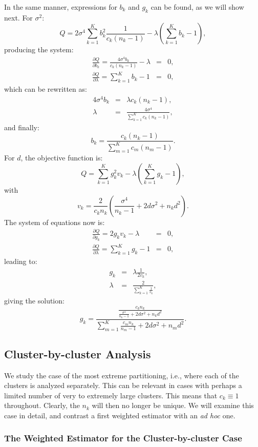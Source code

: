 \documentclass[11pt,a5paper,twoside]{book}
\begin{document}
{In the same manner, expressions for $b_k$ and $g_k$ can be found, as we will show next.
For $\sigma^2$:
$$
Q=2\sigma^4 \sum_{k=1}^K b_k^2\frac{1}{c_k(n_k-1)}-\lambda\left(\sum_{k=1}^Kb_k-1\right),
$$
producing the system:
\begin{eqnarray}
\frac{\partial Q}{\partial b_k}=\frac{4\sigma^4 b_k}{c_k(n_k-1)}-\lambda&=&0, \\
\frac{\partial Q}{\partial \lambda}= \sum_{k=1}^Kb_k-1&=&0,
\end{eqnarray}
which can be rewritten as:
\begin{eqnarray}
4\sigma^4 b_k&=&\lambda c_k (n_k-1),\\
\lambda&=& \frac{4\sigma^4}{\sum_{k=1}^Kc_k(n_k-1)},
\end{eqnarray}
and finally:
$$b_k= \frac{c_k(n_k-1)}{\sum_{m=1}^K c_m(n_m-1)}.
$$
For $d$, the objective function is:
$$
Q=\sum_{k=1}^K g_k^2 v_k-\lambda(\sum_{k=1}^Kg_k-1),
$$
with
$$v_k=\frac{2}{c_kn_k}\left( \frac{\sigma^4}{n_k-1}+2d\sigma^2+n_kd^2\right).$$
The system of equations now is:
\begin{eqnarray}
\frac{\partial Q}{\partial g_k}=2g_k v_k-\lambda&=&0, \\
\frac{\partial Q}{\partial \lambda}= \sum_{k=1}^K g_k-1&=&0,
\end{eqnarray}
leading to:
\begin{eqnarray}
g_k&=&\lambda \frac{1}{2 v_k},\\
\lambda&=& \frac{2}{\sum_{k=1}^K \frac{1}{v_k}},
\end{eqnarray}
giving the solution:
$$ g_k= \frac{\frac{c_kn_k}{\frac{\sigma^4}{n_k-1}+2d\sigma^2+n_kd^2}}{\sum_{m=1}^K\frac{c_m n_k}{n_m-1}+2d\sigma^2+n_md^2}.$$

\subsection{Cluster-by-cluster Analysis}
\label{cbcaapp}

We study the case of the most extreme partitioning, i.e., where each of the clusters is analyzed separately. 
This can be relevant in cases with perhaps a limited number of very to extremely large clusters.  This 
means that $c_k\equiv 1$ throughout. Clearly, the $n_k$ will 
then no longer be unique. We will examine this case in detail, 
and contrast a first weighted estimator with an  
{\em ad hoc\/} one.


\subsubsection{The Weighted Estimator for the Cluster-by-cluster Case}

}
\end{document}
